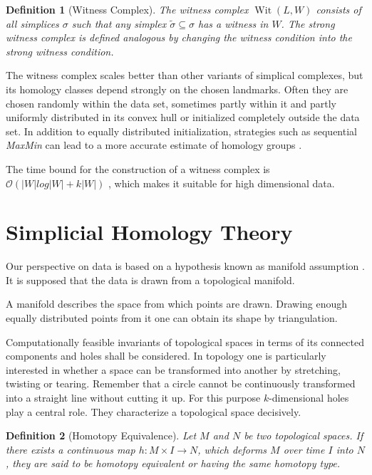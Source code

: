 \documentclass[journal]{IEEEtran}
\DeclareMathOperator{\Wit}{Wit}
\newtheorem{definition}{Definition}[section]
\begin{document}
\begin{definition}[Witness Complex]
The witness complex $\Wit(L,W)$ consists of all simplices $\sigma$ such that any simplex $\tilde{\sigma} \subseteq \sigma$ has a witness in $W$. The strong witness complex is defined analogous by changing the witness condition into the strong witness condition.
\end{definition}

The witness complex scales better than other variants of  simplical complexes, but its homology classes depend strongly on the chosen landmarks. Often they are chosen randomly within the data set, sometimes partly within it and partly uniformly distributed in its convex hull or initialized completely outside the data set. In addition to equally distributed initialization, strategies such as sequential \textit{MaxMin} can lead to a more accurate estimate of homology groups \cite{de2004topological}.

The time bound for the construction of a witness complex is $\mathcal{O}\left(|W|log|W|+k|W|\right)$ \cite{boissonnat2018geometric}, which makes it suitable for high dimensional data.

\section{Simplicial Homology Theory}
\label{sec:simplicialhomology}
Our perspective on data is based on a hypothesis known as manifold assumption \cite{LinZ08}. It is supposed that the data is drawn from a topological manifold.

A manifold describes the space from which points are drawn. Drawing enough equally distributed points from it one can obtain its shape by triangulation.

Computationally feasible invariants of topological spaces in terms of its connected components and holes shall be considered. In topology one is particularly interested in whether a space can be transformed into another by stretching, twisting or tearing. Remember that a circle cannot be continuously transformed into a straight line without cutting it up. For this purpose $k$-dimensional holes play a central role. They characterize a topological space decisively.

\begin{definition}[Homotopy Equivalence]
Let $M$ and $N$ be two topological spaces. If there exists a continuous map $h: M \times I \rightarrow N$, which deforms $M$ over time $I$ into $N$, they are said to be homotopy equivalent or having the same homotopy type.
\end{definition}
\end{document}
